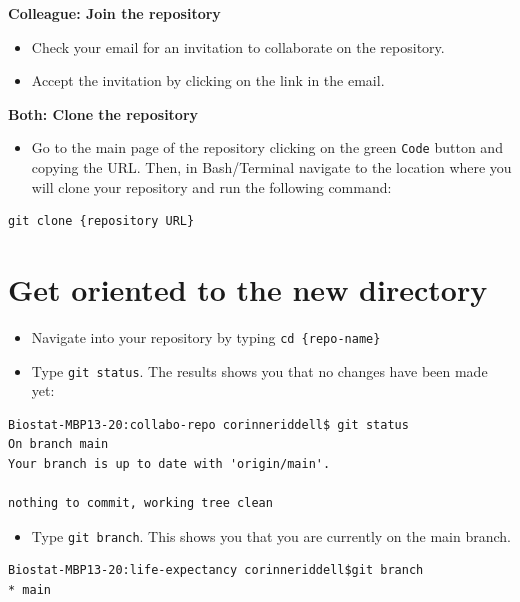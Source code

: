 \documentclass[
]{book}
\providecommand{\tightlist}{%
  \setlength{\itemsep}{0pt}\setlength{\parskip}{0pt}}
\begin{document}
\textbf{Colleague: Join the repository}

\begin{itemize}
\tightlist
\item
  Check your email for an invitation to collaborate on the repository.
\item
  Accept the invitation by clicking on the link in the email.
\end{itemize}

\textbf{Both: Clone the repository}

\begin{itemize}
\tightlist
\item
  Go to the main page of the repository clicking on the green \texttt{Code} button and
  copying the URL. Then, in Bash/Terminal navigate to the location where you will
  clone your repository and run the following command:
\end{itemize}

\begin{verbatim}
git clone {repository URL}
\end{verbatim}

\section{Get oriented to the new directory}\label{get-oriented-to-the-new-directory}

\begin{itemize}
\tightlist
\item
  Navigate into your repository by typing \texttt{cd\ \{repo-name\}}
\item
  Type \texttt{git\ status}. The results shows you that no changes have been made yet:
\end{itemize}

\begin{verbatim}
Biostat-MBP13-20:collabo-repo corinneriddell$ git status
On branch main
Your branch is up to date with 'origin/main'.

nothing to commit, working tree clean
\end{verbatim}

\begin{itemize}
\tightlist
\item
  Type \texttt{git\ branch}. This shows you that you are currently on the main branch.
\end{itemize}

\begin{verbatim}
Biostat-MBP13-20:life-expectancy corinneriddell$git branch
* main
\end{verbatim}
\end{document}
